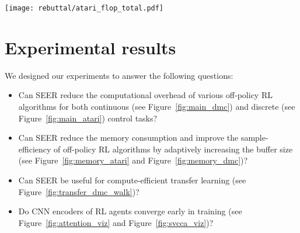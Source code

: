\documentclass{article}
\begin{document}
\begin{figure*} [t] \centering
\texttt{[image: rebuttal/atari\_flop\_total.pdf]}
\caption{Learning curves for Rainbow with and without SEER, where the x-axis shows estimated cumulative FLOPs. The dotted gray line denotes the encoder freezing time $t=T_f$. The solid line and shaded regions represent the mean and standard deviation, respectively, across five runs.}
\label{fig:main_atari}
\vspace{-0.1in}
\end{figure*}



\section{Experimental results}


We designed our experiments to answer the following questions: 
\begin{itemize} [leftmargin=8mm] \setlength\itemsep{0.1em}
  \item Can SEER reduce the computational overhead of various off-policy RL algorithms for both continuous (see Figure~\ref{fig:main_dmc}) and discrete (see Figure~\ref{fig:main_atari}) control tasks?
  \item Can SEER reduce the memory consumption and improve the sample-efficiency of off-policy RL algorithms by adaptively increasing the buffer size (see Figure~\ref{fig:memory_atari} and Figure~\ref{fig:memory_dmc})?
  \item Can SEER be useful for compute-efficient transfer learning (see Figure~\ref{fig:transfer_dmc_walk})?
  \item Do CNN encoders of RL agents converge early in training (see Figure~\ref{fig:attention_viz} and Figure~\ref{fig:svcca_viz})? 
\end{itemize}
\end{document}

